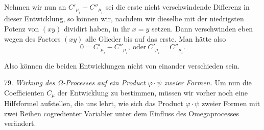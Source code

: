 \documentclass[11pt]{article}
\providecommand{\weberpage}[1]{}
\let\Omega\varOmega
\begin{document}
\weberpage{83}

Nehmen wir nun an $C'_{\mu_i} - C''_{\mu_i}$ sei die erste nicht verschwindende Differenz in dieser Entwicklung, so können wir, nachdem wir dieselbe mit der niedrigsten Potenz von $(xy)$ dividirt haben, in ihr $x=y$ setzen. Dann verschwinden eben wegen des Factors $(xy)$ alle Glieder bis auf das erste. Man hätte also
\[ 0 = C'_{\mu_i} - C''_{\mu_i}, \ \text{oder} \ C'_{\mu_i} = C''_{\mu_i}. \]

Also können die beiden Entwicklungen nicht von einander verschieden sein.

79. \textit{Wirkung des $\Omega$-Processes auf ein Product $\varphi \cdot \psi$ zweier Formen.} Um nun die Coefficienten $C_\mu$ der Entwicklung zu bestimmen, müssen wir vorher noch eine Hilfsformel aufstellen, die uns lehrt, wie sich das Product $\varphi \cdot \psi$ zweier Formen mit zwei Reihen cogredienter Variabler unter dem Einfluss des Omegaprocesses verändert.
\end{document}
